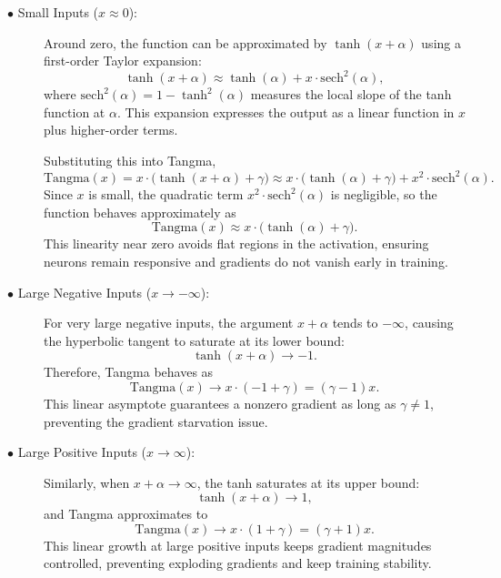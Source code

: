 \documentclass{article}
\begin{document}
\vspace{5pt}
\begin{description}

\item[$\bullet$ Small Inputs (\( x \approx 0 \)):] 

Around zero, the function can be approximated by \( \tanh(x + \alpha) \) using a first-order Taylor expansion:
\[
\tanh(x + \alpha) \approx \tanh(\alpha) + x \cdot \text{sech}^2(\alpha),
\]
where \( \text{sech}^2(\alpha) = 1 - \tanh^2(\alpha) \) measures the local slope of the tanh function at \( \alpha \). This expansion expresses the output as a linear function in \( x \) plus higher-order terms.

Substituting this into Tangma,
  \[
    \text{Tangma}(x) = x \cdot \big(\tanh(x + \alpha) + \gamma\big) \approx x \cdot \big(\tanh(\alpha) + \gamma\big) + x^2 \cdot \text{sech}^2(\alpha).
  \]
  Since \( x \) is small, the quadratic term \( x^2 \cdot \text{sech}^2(\alpha) \) is negligible, so the function behaves approximately as
  \[
    \text{Tangma}(x) \approx x \cdot \big(\tanh(\alpha) + \gamma\big).
  \]
  This linearity near zero avoids flat regions in the activation, ensuring neurons remain responsive and gradients do not vanish early in training.

  \item[$\bullet$ Large Negative Inputs (\( x \to -\infty \)):] 

  For very large negative inputs, the argument \( x + \alpha \) tends to \(-\infty\), causing the hyperbolic tangent to saturate at its lower bound:
  \[
    \tanh(x + \alpha) \to -1.
  \]
  Therefore, Tangma behaves as
  \[
    \text{Tangma}(x) \to x \cdot (-1 + \gamma) = (\gamma - 1) x.
  \]
  This linear asymptote guarantees a nonzero gradient as long as \( \gamma \neq 1 \), preventing the gradient starvation issue.

  \item[$\bullet$ Large Positive Inputs (\( x \to \infty \)):] 

  Similarly, when \( x + \alpha \to \infty \), the tanh saturates at its upper bound:
  \[
    \tanh(x + \alpha) \to 1,
  \]
  and Tangma approximates to
  \[
    \text{Tangma}(x) \to x \cdot (1 + \gamma) = (\gamma + 1) x.
  \]
  This linear growth at large positive inputs keeps gradient magnitudes controlled, preventing exploding gradients and keep training stability.

\end{description}
\end{document}
